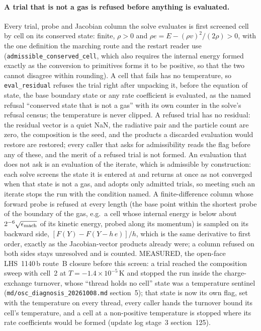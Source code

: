 \paragraph{A trial that is not a gas is refused before anything is evaluated.}
Every trial, probe and Jacobian column the solve evaluates is first screened
cell by cell on its conserved state: finite, $\rho > 0$ and
$\rho e = E - (\rho v)^2/(2\rho) > 0$, with the one definition the marching
route and the restart reader use (\texttt{admissible\_conserved\_cell}, which
also requires the internal energy formed exactly as the conversion to
primitives forms it to be positive, so that the two cannot disagree within
rounding).  A cell that fails has no temperature, so \texttt{eval\_residual}
refuses the trial right after unpacking it, before the equation of state, the
base boundary state or any rate coefficient is evaluated, as the named
refusal ``conserved state that is not a gas'' with its own counter in the
solve's refusal census; the temperature is never clipped.  A refused trial has
no residual: the residual vector is a quiet NaN, the radiative pair and the
particle count are zero, the composition is the seed, and the products a
discarded evaluation would restore are restored; every caller that asks for
admissibility reads the flag before any of these, and the merit of a refused
trial is not formed.  An evaluation that does not ask is an evaluation of the
iterate, which is admissible by construction: each solve screens the state it
is entered at and returns at once as not converged when that state is not a
gas, and adopts only admitted trials, so meeting such an iterate stops the run
with the condition named.  A finite-difference column whose forward probe is
refused at every length (the base point within the shortest probe of the
boundary of the gas, e.g.\ a cell whose internal energy is below about
$2^{-6}\sqrt{\epsilon_{\rm mach}}$ of its kinetic energy, probed along its
momentum) is sampled on its backward side, $[F(Y) - F(Y - h\,e)]/h$, which is
the same derivative to first order, exactly as the Jacobian-vector products
already were; a column refused on both sides stays unresolved and is
counted.  MEASURED, the open-face LHS~1140\,b route~B closure before this
screen: a trial reached the composition sweep with cell~2 at
$T = -1.4\times10^{-5}$\,K and stopped the run inside the charge-exchange
turnover, whose ``thread holds no cell'' state was a temperature sentinel
(\texttt{md/osc\_diagnosis\_20261008.md} section~5); that state is now its own
flag, set with the temperature on every thread, every caller hands the
turnover bound its cell's temperature, and a cell at a non-positive
temperature is stopped where its rate coefficients would be formed (update
log stage~3 section~125).

